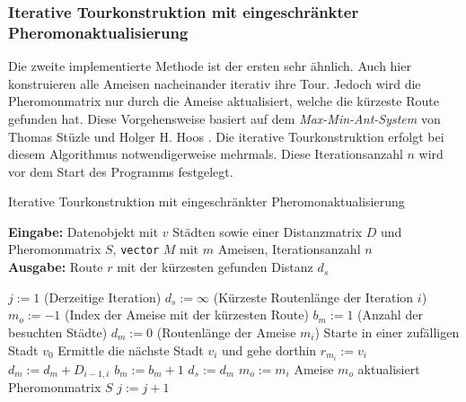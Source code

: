 \documentclass[doktyp=barbeit, sprache=german]{TUBAFarbeiten}
\begin{document}
\subsubsection{Iterative Tourkonstruktion mit eingeschränkter Pheromonaktualisierung}
Die zweite implementierte Methode ist der ersten sehr ähnlich. Auch hier konstruieren alle Ameisen nacheinander iterativ ihre Tour. Jedoch wird die Pheromonmatrix nur durch die Ameise aktualisiert, welche die kürzeste Route gefunden hat. Diese Vorgehensweise basiert auf dem \textit{Max-Min-Ant-System} von Thomas Stüzle und Holger H. Hoos \cite{MaxMin}. Die iterative Tourkonstruktion erfolgt bei diesem Algorithmus notwendigerweise mehrmals. Diese Iterationsanzahl $n$ wird vor dem Start des Programms festgelegt. 
\begin{algorithm}
\caption{Iterative Tourkonstruktion mit eingeschränkter Pheromonaktualisierung}
\label{MMASIterativeTour}
\textbf{Eingabe:} Datenobjekt mit $v$ Städten sowie einer Distanzmatrix $D$ und Pheromonmatrix $S$, \texttt{vector} $M$ mit $m$ Ameisen, Iterationsanzahl $n$
\\\textbf{Ausgabe:} Route $r$ mit der kürzesten gefunden Distanz $d_s$
\begin{algorithmic}[1]
\State $j := 1$ (Derzeitige Iteration)
\State $d_s := \infty$ (Kürzeste Routenlänge der Iteration $i$)
\State $m_o := -1$ (Index der Ameise mit der kürzesten Route)
\State $b_m := 1$ (Anzahl der besuchten Städte)
\State $d_m := 0$ (Routenlänge der Ameise $m_i$)
\State Starte in einer zufälligen Stadt $v_0$
\State Ermittle die nächste Stadt $v_i$ und gehe dorthin
\State $r_{m_i} := v_i$
\State $d_m := d_m + D_{i-1,i}$
\State $b_m := b_m + 1$
\EndWhile
{}
\State $d_s := d_m$
\State $m_o := m_i$
\EndIf
\EndFor
\State Ameise $m_o$ aktualisiert Pheromonmatrix $S$
\State $j := j + 1$
\EndWhile
\end{algorithmic}
\end{algorithm}
\end{document}
